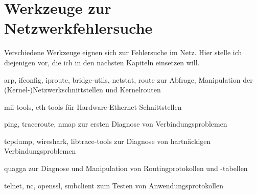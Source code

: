 \chapter{Werkzeuge zur Netzwerkfehlersuche}
\label{cha:netz-werkzeuge}

\begin{abstractsec}
  Verschiedene Werkzeuge eignen sich zur Fehlersuche im Netz. Hier stelle ich
  diejenigen vor, die ich in den nächsten Kapiteln einsetzen will.
\end{abstractsec}

\begin{notes}
\item[arp, ifconfig, iproute, bridge-utils, netstat, route] zur Abfrage,
  Manipulation der (Kernel-)Netzwerkschnittstellen und Kernelrouten
\item[mii-tools, eth-tools] für Hardware-Ethernet-Schnittstellen
\item[ping, traceroute, nmap] zur ersten Diagnose von Verbindungsproblemen
\item[tcpdump, wireshark, libtrace-tools] zur Diagnose von hartnäckigen
  Verbindungsproblemen
\item[quagga] zur Diagnose und Manipulation von Routingprotokollen und
  -tabellen
\item[telnet, nc, openssl, smbclient] zum Testen von Anwendungsprotokollen
\end{notes}

